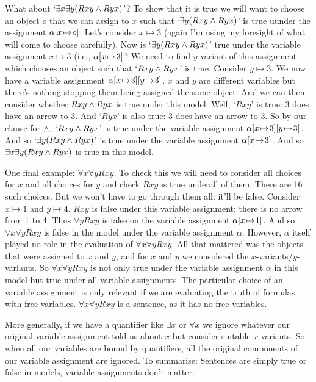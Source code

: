 What about `$\exists x \exists y(Rxy \mathbin{\wedge} Ryx)$'? To show that it is true we will want to choose an object $o$ that we can assign to $x$ such that `$\exists y (Rxy\mathbin{\wedge} Ryx)$' is true uunder the assignment $\alpha[x \!\mapsto\! o]$. Let's consider $x\mapsto 3$ (again I'm using my foresight of what will come to choose carefully). Now is `$\exists y (Rxy\mathbin{\wedge} Ryx)$'  true under the variable assignment $x\mapsto 3$ (i.e., $\alpha[x \!\mapsto\! 3]$? We need to find $y$-variant of this assignment which chooses an object such that `$Rxy\mathbin{\wedge} Ryx$' is true. Consider $y\mapsto 3$. We now have a variable assignment $\alpha[x \!\mapsto\! 3][y \!\mapsto\! 3]$. $x$ and $y$ are different variables but there's nothing stopping them being assigned the same object. And we can then consider whether $Rxy\mathbin{\wedge} Ryx$ is true under this model. Well, `$Rxy$' is true: 3 does have an arrow to 3. And `$Ryx$' is also true: 3 does have an arrow to 3. So by our clause for $\mathbin{\wedge}$, `$Rxy\mathbin{\wedge} Ryx$' is true under the variable assignment $\alpha[x \!\mapsto\! 3][y \!\mapsto\! 3]$. And so `$\exists y(Rxy\mathbin{\wedge} Ryx)$' is true under the variable assignment $\alpha[x \!\mapsto\! 3]$. And so $\exists x\exists y(Rxy\mathbin{\wedge} Ryx)$ is true in this model.


One final example: $\forall x\forall y Rxy$. To check this we will need to consider all choices for $x$ and all choices for $y$ and check $Rxy$ is true underall of them. There are 16 such choices. But we won't have to go through them all: it'll be false. Consider $x\mapsto 1$ and $y\mapsto 4$. $Rxy$ is false under this variable assignment: there is no arrow from 1 to 4. Thus $\forall yRxy$ is false on the variable assignment $\alpha[x \!\mapsto\! 1]$. And so $\forall x\forall y Rxy$ is false in the model under the variable assignment $\alpha$. However, $\alpha$ itself played no role in the evaluation of $\forall x\forall y Rxy$. All that mattered was the objects that were assigned to $x$ and $y$, and for $x$ and $y$ we considered the $x$-variants/$y$-variants. So $\forall x\forall y Rxy$ is not only true under the variable assignment $\alpha$ in this model but true under all variable assignments. The particular choice of an variable assignment is only relevant if we are evaluating the truth of formulas with free variables. $\forall x\forall y Rxy$ is a sentence, as it has no free variables.


More generally, if we have a quantifier like $\exists x$ or $\forall x$ we ignore whatever our original variable assignment told us about $x$ but consider suitable $x$-variants. So when all our variables are bound by quantifiers, all the original components of our variable assignment are ignored. To summarise: Sentences are simply true or false in models, variable assignments don't matter.

